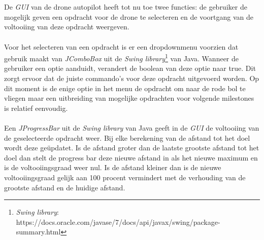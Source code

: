 \\
\\
De \textit{GUI} van de drone autopilot heeft tot nu toe twee functies: de gebruiker de mogelijk geven een opdracht voor de drone te selecteren en de voortgang van de voltooiing van deze opdracht weergeven.
\\
\\
Voor het selecteren van een opdracht is er een dropdownmenu voorzien dat gebruik maakt van \textit{JComboBox} uit de \textit{Swing library}\footnote{\textit{Swing library}: https://docs.oracle.com/javase/7/docs/api/javax/swing/package-summary.html} van Java. Wanneer de gebruiker een optie aanduidt, verandert de boolean van deze optie naar true. Dit zorgt ervoor dat de juiste commando's voor deze opdracht uitgevoerd worden. Op dit moment is de enige optie in het menu de opdracht om naar de rode bol te vliegen maar een uitbreiding van mogelijke opdrachten voor volgende milestones is relatief eenvoudig.
\\
\\
Een \textit{JProgressBar} uit de \textit{Swing library} van Java geeft in de \textit{GUI} de voltooiing van de geselecteerde opdracht weer. Bij elke berekening van de afstand tot het doel wordt deze ge\"{u}pdatet. Is de afstand groter dan de laatste grootste afstand tot het doel dan stelt de progress bar deze nieuwe afstand in als het nieuwe maximum en is de voltooiingsgraad weer nul. Is de afstand kleiner dan is de nieuwe voltooiingsgraad gelijk aan 100 procent vermindert met de verhouding van de grootste afstand en de huidige afstand.  
